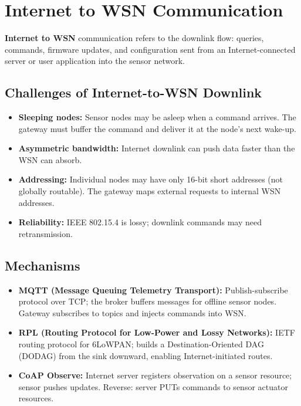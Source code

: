 \documentclass[12pt,a4paper]{article}
\begin{document}
\section{Internet to WSN Communication}

\begin{tcolorbox}[defbox, title={\textbf{Internet-to-WSN Communication}}]
\textbf{Internet to WSN} communication refers to the downlink flow: queries, commands, firmware updates, and configuration sent from an Internet-connected server or user application into the sensor network.
\end{tcolorbox}

\subsection{Challenges of Internet-to-WSN Downlink}
\begin{itemize}[leftmargin=*, itemsep=3pt]
  \item \textbf{Sleeping nodes:} Sensor nodes may be asleep when a command arrives. The gateway must buffer the command and deliver it at the node's next wake-up.
  \item \textbf{Asymmetric bandwidth:} Internet downlink can push data faster than the WSN can absorb.
  \item \textbf{Addressing:} Individual nodes may have only 16-bit short addresses (not globally routable). The gateway maps external requests to internal WSN addresses.
  \item \textbf{Reliability:} IEEE 802.15.4 is lossy; downlink commands may need retransmission.
\end{itemize}

\subsection{Mechanisms}
\begin{itemize}[leftmargin=*, itemsep=3pt]
  \item \textbf{MQTT (Message Queuing Telemetry Transport):} Publish-subscribe protocol over TCP; the broker buffers messages for offline sensor nodes. Gateway subscribes to topics and injects commands into WSN.
  \item \textbf{RPL (Routing Protocol for Low-Power and Lossy Networks):} IETF routing protocol for 6LoWPAN; builds a Destination-Oriented DAG (DODAG) from the sink downward, enabling Internet-initiated routes.
  \item \textbf{CoAP Observe:} Internet server registers observation on a sensor resource; sensor pushes updates. Reverse: server PUTs commands to sensor actuator resources.
\end{itemize}
\end{document}
